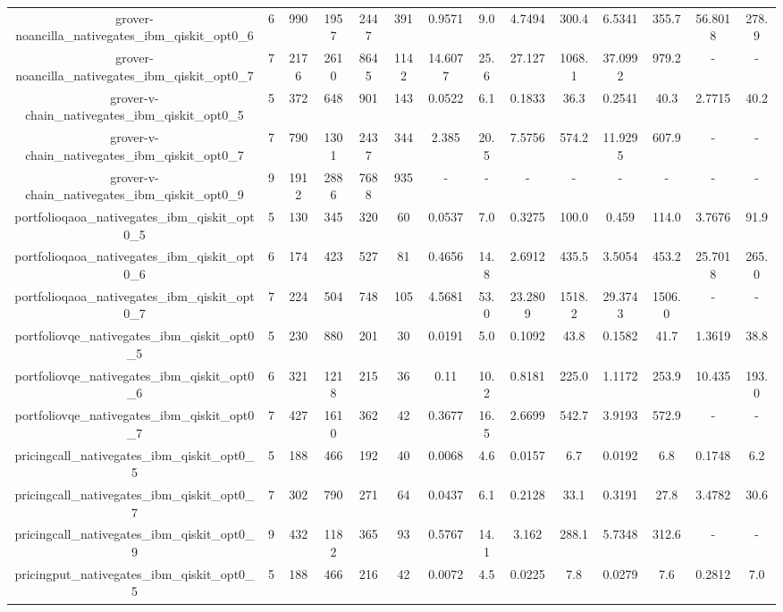 \begin{table}[htb]
{\begin{tabular}{|c|c|c|c|c|c|c|c|c|c|c|c|c|c|}
grover-noancilla\_nativegates\_ibm\_qiskit\_opt0\_6 & 6 & 990 & 1957 & 2447 & 391 & 0.9571 & 9.0 & 4.7494 & 300.4 & 6.5341 & 355.7 & 56.8018 & 278.9 \\ 
grover-noancilla\_nativegates\_ibm\_qiskit\_opt0\_7 & 7 & 2176 & 2610 & 8645 & 1142 & 14.6077 & 25.6 & 27.127 & 1068.1 & 37.0992 & 979.2 & - & - \\ 
grover-v-chain\_nativegates\_ibm\_qiskit\_opt0\_5 & 5 & 372 & 648 & 901 & 143 & 0.0522 & 6.1 & 0.1833 & 36.3 & 0.2541 & 40.3 & 2.7715 & 40.2 \\ 
grover-v-chain\_nativegates\_ibm\_qiskit\_opt0\_7 & 7 & 790 & 1301 & 2437 & 344 & 2.385 & 20.5 & 7.5756 & 574.2 & 11.9295 & 607.9 & - & - \\ 
grover-v-chain\_nativegates\_ibm\_qiskit\_opt0\_9 & 9 & 1912 & 2886 & 7688 & 935 & - & - & - & - & - & - & - & - \\ 
portfolioqaoa\_nativegates\_ibm\_qiskit\_opt0\_5 & 5 & 130 & 345 & 320 & 60 & 0.0537 & 7.0 & 0.3275 & 100.0 & 0.459 & 114.0 & 3.7676 & 91.9 \\ 
portfolioqaoa\_nativegates\_ibm\_qiskit\_opt0\_6 & 6 & 174 & 423 & 527 & 81 & 0.4656 & 14.8 & 2.6912 & 435.5 & 3.5054 & 453.2 & 25.7018 & 265.0 \\ 
portfolioqaoa\_nativegates\_ibm\_qiskit\_opt0\_7 & 7 & 224 & 504 & 748 & 105 & 4.5681 & 53.0 & 23.2809 & 1518.2 & 29.3743 & 1506.0 & - & - \\ 
portfoliovqe\_nativegates\_ibm\_qiskit\_opt0\_5 & 5 & 230 & 880 & 201 & 30 & 0.0191 & 5.0 & 0.1092 & 43.8 & 0.1582 & 41.7 & 1.3619 & 38.8 \\ 
portfoliovqe\_nativegates\_ibm\_qiskit\_opt0\_6 & 6 & 321 & 1218 & 215 & 36 & 0.11 & 10.2 & 0.8181 & 225.0 & 1.1172 & 253.9 & 10.435 & 193.0 \\ 
portfoliovqe\_nativegates\_ibm\_qiskit\_opt0\_7 & 7 & 427 & 1610 & 362 & 42 & 0.3677 & 16.5 & 2.6699 & 542.7 & 3.9193 & 572.9 & - & - \\ 
pricingcall\_nativegates\_ibm\_qiskit\_opt0\_5 & 5 & 188 & 466 & 192 & 40 & 0.0068 & 4.6 & 0.0157 & 6.7 & 0.0192 & 6.8 & 0.1748 & 6.2 \\ 
pricingcall\_nativegates\_ibm\_qiskit\_opt0\_7 & 7 & 302 & 790 & 271 & 64 & 0.0437 & 6.1 & 0.2128 & 33.1 & 0.3191 & 27.8 & 3.4782 & 30.6 \\ 
pricingcall\_nativegates\_ibm\_qiskit\_opt0\_9 & 9 & 432 & 1182 & 365 & 93 & 0.5767 & 14.1 & 3.162 & 288.1 & 5.7348 & 312.6 & - & - \\ 
pricingput\_nativegates\_ibm\_qiskit\_opt0\_5 & 5 & 188 & 466 & 216 & 42 & 0.0072 & 4.5 & 0.0225 & 7.8 & 0.0279 & 7.6 & 0.2812 & 7.0 \\ 

\end{tabular}}
\end{table}
